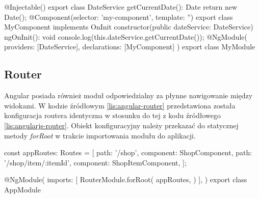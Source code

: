 	\begin{code}[
		language=javascript,
		caption={Utworzenie i użycie serwisu w Angularze (źródło: opracowanie własne)},
		label={lis:angular-serwis},
		escapechar=|
	]
@Injectable()
export class DateService {
  getCurrentDate(): Date {
    return new Date();
  }
}
@Component({selector: 'my-component', template: ''})
export class MyComponent implements OnInit {
  constructor(public dateService: DateService) {
  }
  ngOnInit(): void {
    console.log(this.dateService.getCurrentDate());
  }
}
@NgModule({
  providers: [DateService],
  declarations: [MyComponent]
})
export class MyModule {
}
	\end{code} 
	
	\subsection{Router}
	Angular posiada również moduł odpowiedzialny za płynne nawigowanie między widokami. W kodzie źródłowym \ref{lis:angular-router} przedstawiona została konfiguracja routera identyczna w stosunku do tej z kodu źródłowego \ref{lis:angularjs-router}. Obiekt konfiguracyjny należy przekazać do statycznej metody \textit{forRoot} w trakcie importowania modułu do aplikacji.
	
	\begin{code}[
		language=javascript,
		caption={Konfiguracja routera w Angularze (źródło: opracowanie własne)},
		label={lis:angular-router},
		escapechar=|
	]
const appRoutes: Routes = [
  {path: '/shop', component: ShopComponent},
  {path: '/shop/item/:itemId', component: ShopItemComponent},
];

@NgModule({
  imports: [
    RouterModule.forRoot(
      appRoutes,
    )
  ],
})
export class AppModule {
}
	\end{code} 
	



























